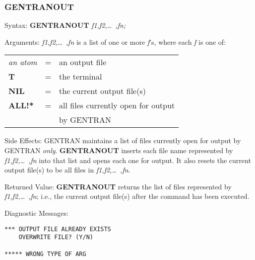 \subsubsection{GENTRANOUT}
\begin{describe}{Syntax:}
{\bf GENTRANOUT} {\it f1,f2,\dots\ ,fn;}
\end{describe}
\begin{describe}{Arguments:}
{\it f1,f2,\dots\ ,fn\/} is a list of one or more {\it f\/}'s, where each
{\it f\/} is one of:
\begin{center}
\begin{tabular}{lll}
{\it an atom} & = & an output file\\
{\bf T} & = & the terminal\\
{\bf NIL} & = & the current output file(s)\\
{\bf ALL!*} & = & all files currently open for output \\
& & by GENTRAN\\
\end{tabular}
\end{center}
\end{describe}
\begin{describe}{Side Effects:}
GENTRAN maintains a list of files currently open for output by
GENTRAN {\it only}.  {\bf GENTRANOUT} inserts each file name represented by
{\it f1,f2,\dots\ ,fn\/} into that list and opens each one for output.  It
also resets the current output file(s) to be all files in {\it f1,f2,\dots\
 ,fn}.
\end{describe}
\begin{describe}{Returned Value:}
{\bf GENTRANOUT} returns the list of files represented by
{\it f1,f2,\dots\ ,fn\/};
i.e., the current output file(s) after the command has been executed.
\end{describe}
\begin{describe}{Diagnostic Messages:}
\begin{verbatim}
*** OUTPUT FILE ALREADY EXISTS
    OVERWRITE FILE? (Y/N)

***** WRONG TYPE OF ARG
\end{verbatim}
\end{describe}
